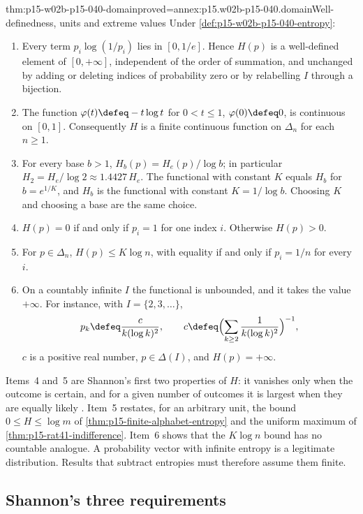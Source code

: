 \begin{hbtheorem}{thm:p15-w02b-p15-040-domain}{proved=annex:p15.w02b-p15-040.domain}{Well-definedness, units and extreme values}
Under \cref{def:p15-w02b-p15-040-entropy}:
\begin{enumerate}
\item Every term \(p_i\log(1/p_i)\) lies in \([0,1/e]\). Hence \(H(p)\)
is a well-defined element of \([0,+\infty]\), independent of the order
of summation, and unchanged by adding or deleting indices of
probability zero or by relabelling \(I\) through a bijection.
\item The function \(\varphi(t)\defeq-t\log t\) for \(0<t\leq1\),
\(\varphi(0)\defeq0\), is continuous on \([0,1]\). Consequently
\(H\) is a finite continuous function on \(\Delta_n\) for each
\(n\geq1\).
\item For every base \(b>1\), \(H_b(p)=H_e(p)/\log b\); in particular
\(H_2=H_e/\log2\approx1.4427\,H_e\). The functional with constant
\(K\) equals \(H_b\) for \(b=e^{1/K}\), and \(H_b\) is the functional
with constant \(K=1/\log b\). Choosing \(K\) and choosing a base are the
same choice.
\item \(H(p)=0\) if and only if \(p_i=1\) for one index \(i\). Otherwise
\(H(p)>0\).
\item For \(p\in\Delta_n\), \(H(p)\leq K\log n\), with equality if and
only if \(p_i=1/n\) for every \(i\).
\item On a countably infinite \(I\) the functional is unbounded, and it
takes the value \(+\infty\). For instance, with
\(I=\{2,3,\ldots\}\),
\[
 p_k\defeq\frac{c}{k(\log k)^2},\qquad
 c\defeq\Bigl(\sum_{k\geq2}\frac1{k(\log k)^2}\Bigr)^{-1},
\]
\(c\) is a positive real number, \(p\in\Delta(I)\), and
\(H(p)=+\infty\).
\end{enumerate}
\end{hbtheorem}

Items~4 and~5 are Shannon's first two properties of \(H\): it vanishes
only when the outcome is certain, and for a given number of outcomes it
is largest when they are equally likely
\cite[p.~11]{Shannon1948MathematicalTheory}. Item~5 restates, for an
arbitrary unit, the bound \(0\leq H\leq\log m\) of
\cref{thm:p15-finite-alphabet-entropy} and the uniform maximum of
\cref{thm:p15-rat41-indifference}. Item~6 shows that the
\(K\log n\) bound has no countable analogue. A probability vector with
infinite entropy is a legitimate distribution. Results that subtract
entropies must therefore assume them finite.

\subsection{Shannon's three requirements}
\label{sec:p15-w02b-p15-040-requirements}

